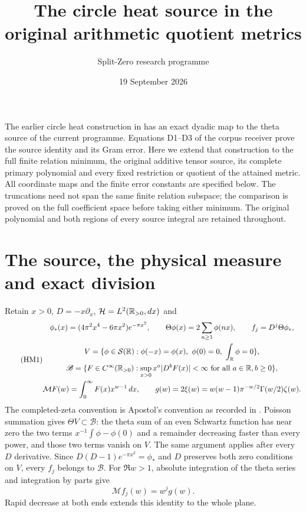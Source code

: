 \documentclass[11pt]{article}
\title{The circle heat source in the original arithmetic quotient metrics}
\author{Split-Zero research programme}
\date{19 September 2026}
\newcommand{\B}{\mathscr B}\newcommand{\M}{\mathcal M}
\begin{document}
\maketitle

The earlier circle heat construction in \cite{oldcircle} has an exact
dyadic map to the theta source of the current programme. Equations D1--D3
of the corpus receiver \cite{corpus} prove the source identity and its
Gram error. Here we extend that construction to the full finite relation
minimum, the original additive tensor source, its complete primary
polynomial and every fixed restriction or quotient of the attained metric.
All coordinate maps and the finite error constants are specified below.
The truncations need not span the same finite relation subspace; the
comparison is proved on the full coefficient space before taking either
minimum. The original polynomial and both regions of every source integral
are retained throughout.

\section{The source, the physical measure and exact division}
Retain $x>0$, $D=-x\partial_x$, $\mathcal H=L^2(\mathbb R_{>0},dx)$ and
\begin{equation}\tag{HM1}
 \begin{gathered}
 \phi_*(x)=(4\pi^2x^4-6\pi x^2)e^{-\pi x^2},\qquad
 \Theta\phi(x)=2\sum_{n\ge1}\phi(nx),\qquad f_j=D^j\Theta\phi_*,\\
 V=\{\phi\in\mathcal S(\R):\phi(-x)=\phi(x),\ \phi(0)=0,
                           \ \int_\R\phi=0\},\\
 \B=\{F\in C^\infty(\R_{>0}):
         \sup_{x>0}x^a|D^bF(x)|<\infty\text{ for all }a\in\R, b\ge0\},\\
 \M F(w)=\int_0^\infty F(x)x^{w-1}\,dx,\qquad
 g(w)=2\xi(w)=w(w-1)\pi^{-w/2}\Gamma(w/2)\zeta(w).
 \end{gathered}
\end{equation}
The completed-zeta convention is Apostol's convention as recorded in
\cite{DLMF25}. Poisson summation gives $\Theta V\subset\B$:
the theta sum of an even Schwartz function has near zero the two terms
$x^{-1}\int\phi-\phi(0)$ and a remainder decreasing faster than every
power, and those two terms vanish on $V$. The same argument applies after
every $D$ derivative. Since $D(D-1)e^{-\pi x^2}=\phi_*$ and $D$ preserves
both zero conditions on $V$, every $f_j$ belongs to $\B$.
For $\Re w>1$, absolute integration of the theta series and integration
by parts give
\begin{equation}\tag{HM2}
 \M f_j(w)=w^j g(w).
\end{equation}
Rapid decrease at both ends extends this identity to the whole plane.
\end{document}

